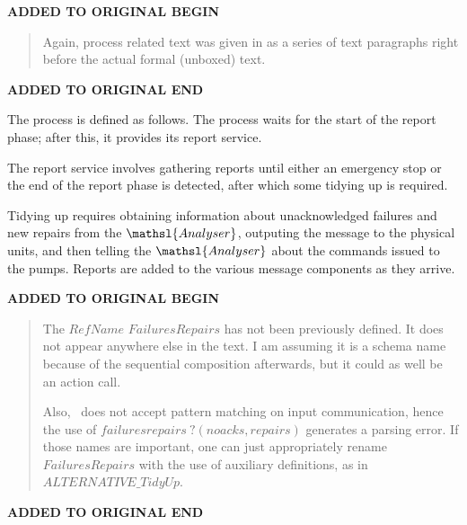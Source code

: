 \documentclass{report}
\newenvironment{addedstuff}{\begin{flushleft}\textbf{ADDED TO ORIGINAL BEGIN}\begin{quote}\begin{minipage}{.8\textwidth}}{\end{minipage}\end{quote}\textbf{ADDED TO ORIGINAL END}\end{flushleft}}
\begin{document}
\begin{addedstuff}
   Again, process related text was given in as a series of text paragraphs
   right before the actual formal (unboxed) text.
\end{addedstuff}

The process is defined as follows.
The process waits for the start of the report phase; after this, it
provides its report service.

The report service involves gathering reports until either an
emergency stop or the end of the report phase is detected, after which
some tidying up is required.

Tidying up requires obtaining information about unacknowledged
failures and new repairs from the \( \mathsl{Analyser}\), outputing
the message to the physical units, and then telling the \(
\mathsl{Analyser} \) about the commands issued to the pumps.
Reports are added to the various message components as they arrive.

\begin{addedstuff}
   The $RefName$ $FailuresRepairs$ has not been previously defined.
   It does not appear anywhere else in the text. I am assuming it is
   a schema name because of the sequential composition afterwards, but
   it could as well be an action call.

   Also, \Circus\ does not accept pattern matching on input communication,
   hence the use of $failuresrepairs~?(noacks,repairs)$ generates a parsing error.
   If those names are important, one can just appropriately rename $FailuresRepairs$
   with the use of auxiliary definitions, as in $ALTERNATIVE\_TidyUp$.
\end{addedstuff}
\end{document}
